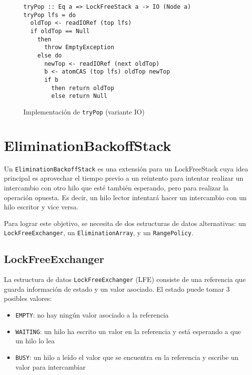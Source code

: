 \begin{figure}[H]
\begin{verbatim}
tryPop :: Eq a => LockFreeStack a -> IO (Node a)
tryPop lfs = do
  oldTop <- readIORef (top lfs)
  if oldTop == Null
    then
      throw EmptyException
    else do
      newTop <- readIORef (next oldTop)
      b <- atomCAS (top lfs) oldTop newTop
      if b
        then return oldTop
        else return Null
\end{verbatim}
\caption{Implementación de \texttt{tryPop} (variante IO)}
\end{figure}



\clearpage
\section{EliminationBackoffStack}\label{sec:ebs}

Un \texttt{EliminationBackoffStack} es una extensión para un LockFreeStack cuya idea principal es aprovechar el tiempo previo a un reintento para intentar realizar un intercambio con otro hilo que esté también esperando, pero para realizar la operación opuesta. Es decir, un hilo lector intentará hacer un intercambio con un hilo escritor y vice versa.

Para lograr este objetivo, se necesita de dos estructuras de datos alternativas: un \texttt{LockFreeExchanger}, un \texttt{EliminationArray}, y un \texttt{RangePolicy}.


\subsection{LockFreeExchanger}\label{sub-lfe}
La estructura de datos \texttt{LockFreeExchanger} (LFE) consiste de una referencia que guarda información de estado y un valor asociado. El estado puede tomar 3 posibles valores:

\begin{itemize}
\item{\texttt{EMPTY}: no hay ningún valor asociado a la referencia}
\item{\texttt{WAITING}: un hilo ha escrito un valor en la referencia y está esperando a que un hilo lo lea}
\item{\texttt{BUSY}: un hilo a leído el valor que se encuentra en la referencia y escribe un valor para intercambiar}
\end{itemize}

